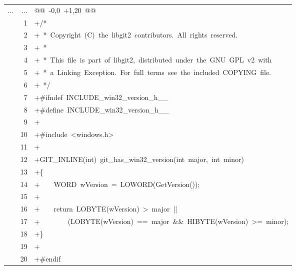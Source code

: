 {\ttfamily\scriptsize

\begin{longtabu} to 

\hline

... & ... & \textcolor{DiffLineNumber}{@@\ -0,0\ +1,20\ @@} \tabularnewline
& 1 &  +/* \tabularnewline
& 2 &  +\ *\ Copyright\ (C)\ the\ libgit2\ contributors.\ All\ rights\ reserved. \tabularnewline
& 3 &  +\ * \tabularnewline
& 4 &  +\ *\ This\ file\ is\ part\ of\ libgit2,\ distributed\ under\ the\ GNU\ GPL\ v2\ with \tabularnewline
& 5 &  +\ *\ a\ Linking\ Exception.\ For\ full\ terms\ see\ the\ included\ COPYING\ file. \tabularnewline
& 6 &  +\ */ \tabularnewline
& 7 &  +\#ifndef\ INCLUDE\_win32\_version\_h\_\_ \tabularnewline
& 8 &  +\#define\ INCLUDE\_win32\_version\_h\_\_ \tabularnewline
& 9 &  + \tabularnewline
& 10 &  +\#include\ <windows.h> \tabularnewline
& 11 &  + \tabularnewline
& 12 &  +GIT\_INLINE(int)\ git\_has\_win32\_version(int\ major,\ int\ minor) \tabularnewline
& 13 &  +\{ \tabularnewline
& 14 &  +\ \ \ \ WORD\ wVersion\ =\ LOWORD(GetVersion()); \tabularnewline
& 15 &  + \tabularnewline
& 16 &  +\ \ \ \ return\ LOBYTE(wVersion)\ >\ major\ || \tabularnewline
& 17 &  +\ \ \ \ \ \ \ \ (LOBYTE(wVersion)\ ==\ major\ \&\&\ HIBYTE(wVersion)\ >=\ minor); \tabularnewline
& 18 &  +\} \tabularnewline
& 19 &  + \tabularnewline
& 20 &  +\#endif \tabularnewline

\hline
\end{longtabu}
}
